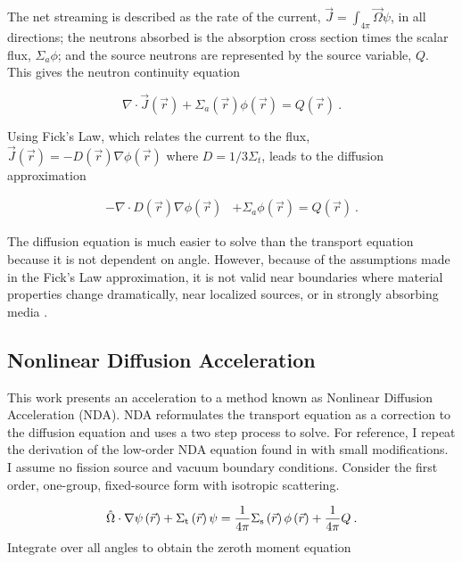 The net streaming is described as the rate of the current, $\vec{J} = \int_{4\pi} \vec{\Omega}\psi$, in all directions; the neutrons absorbed is the absorption cross section times the scalar flux, $\Sigma_a\phi$; and the source neutrons are represented by the source variable, $Q$. This gives the neutron continuity equation

\begin{equation}
\nabla\cdot \vec{J}(\vec{r}) + \Sigma_a(\vec{r})\phi(\vec{r}) = Q(\vec{r})\:.
\end{equation}

Using Fick's Law, which relates the current to the flux, $\vec{J}(\vec{r}) = -D(\vec{r})\nabla\phi(\vec{r})$ where $D = 1/3\Sigma_t$, leads to the diffusion approximation

\begin{equation}
\begin{split}
 - \nabla \cdot D(\vec{r})\nabla\phi(\vec{r}) &+ \Sigma_a \phi(\vec{r}) = Q(\vec{r})\:.
\end{split}
\label{eq:diffusion_fixed_source}
\end{equation}

The diffusion equation is much easier to solve than the transport equation because it is not dependent on angle. However, because of the assumptions made in the Fick's Law approximation, it is not valid near boundaries where material properties change dramatically, near localized sources, or in strongly absorbing media \cite{lewis-miller}.

\subsection{Nonlinear Diffusion Acceleration}

This work presents an acceleration to a method known as Nonlinear Diffusion Acceleration (NDA). NDA reformulates the transport equation as a correction to the diffusion equation and uses a two step process to solve. For reference, I repeat the derivation of the low-order NDA equation found in \cite{morel-holo} with small modifications. I assume no fission source and vacuum boundary conditions. Consider the first order, one-group, fixed-source form with isotropic scattering. 


  \begin{equation}
  \hat{\Omega}\cdot \nabla \psi \left(\vec{r}\right)+ \Sigma_{\mathrm{t}}\left(\vec{r}\right)\psi = \frac{1}{4 \pi} \Sigma_{\mathrm{s}}\left(\vec{r}\right) \phi\left(\vec{r}\right) + \frac{1}{4 \pi} Q\:.
  \end{equation}
Integrate over all angles to obtain the zeroth moment equation

